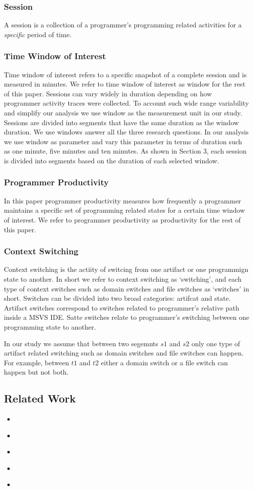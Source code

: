 \subsubsection{Session}
A session is a collection of a programmer's programming related activities for a \textit{specific} period of time.
\subsubsection{Time Window of Interest}
Time window of interest refers to a specific snapshot of a complete session and is measured in minutes. We refer to time window of interest as window for the rest of this paper. Sessions can vary widely in duration depending on how programmer activity traces were collected. To account such wide range variability and simplify our analysis we use window as the measurement unit in our study. Sessions are divided into segments that have the same duration as the window duration. We use windows answer all the three research questions. In our analysis we use window as parameter and vary this parameter in terms of duration such as one minute, five minutes and ten minutes. As shown in Section 3, each session is divided into segments based on the duration of each selected window.
\subsubsection{Programmer Productivity}
In this paper programmer productivity measures how frequently a programmer maintains a specific set of programming related states for a certain time window of interest. We refer to programmer productivity as productivity for the rest of this paper.

\subsubsection{Context Switching}
Context switching is the actiity of switcing from one artifact or one programmign state to another. In short we refer to context switching as `switching', and each type of context switches such as domain switches and file switches as `switches' in short. Switches can be divided into two broad categories: artifcat and state. Artifact switches correspond to switches related to programmer's relative path inside a MSVS IDE. Satte switches relate to programmer's switching between one programming state to another.   

In our study we assume that between two segemnts $s1$ and $s2$ only one type of artifact related switching such as domain switches and file switches can happen. For example, between $t1$ and $t2$ either a domain switch or a file switch can happen but not both. 

\subsection{Related Work}

\begin{itemize}
\item{ ~\cite{lungu:devinfoneed} }
\item{ ~\cite{kevic:banita:changetask} }
\item{ ~\cite{robilliard:task:icpc} }
\item{ ~\cite{Parnin:Resumption} }
\item{ ~\cite{Ko:tse} }
\end{itemize}       





